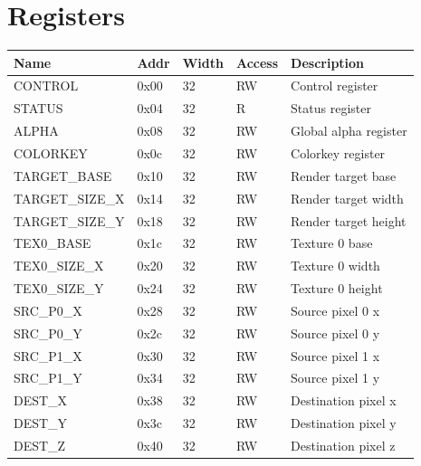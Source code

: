 \documentclass[10pt,a4paper]{article}
\begin{document}
\section{Registers}
\label{sec:registers}
\begin{tabular}{|l|l|l|l|l|}
\hline \textbf{Name} & \textbf{Addr} & \textbf{Width} & \textbf{Access} & \textbf{Description} \\ 
\hline
\hline CONTROL         & 0x00 & 32 & RW & Control register \\
\hline STATUS          & 0x04 & 32 & R  & Status register \\
\hline ALPHA           & 0x08 & 32 & RW & Global alpha register \\
\hline COLORKEY        & 0x0c & 32 & RW & Colorkey register \\

\hline TARGET\_BASE    & 0x10 & 32 & RW & Render target base \\
\hline TARGET\_SIZE\_X & 0x14 & 32 & RW & Render target width \\
\hline TARGET\_SIZE\_Y & 0x18 & 32 & RW & Render target height \\

\hline TEX0\_BASE      & 0x1c & 32 & RW & Texture 0 base \\
\hline TEX0\_SIZE\_X   & 0x20 & 32 & RW & Texture 0 width \\
\hline TEX0\_SIZE\_Y   & 0x24 & 32 & RW & Texture 0 height \\

\hline SRC\_P0\_X      & 0x28 & 32 & RW & Source pixel 0 x \\
\hline SRC\_P0\_Y      & 0x2c & 32 & RW & Source pixel 0 y \\
\hline SRC\_P1\_X      & 0x30 & 32 & RW & Source pixel 1 x \\
\hline SRC\_P1\_Y      & 0x34 & 32 & RW & Source pixel 1 y \\

\hline DEST\_X         & 0x38 & 32 & RW & Destination pixel x \\
\hline DEST\_Y         & 0x3c & 32 & RW & Destination pixel y \\
\hline DEST\_Z         & 0x40 & 32 & RW & Destination pixel z \\


\end{tabular}
\end{document}
